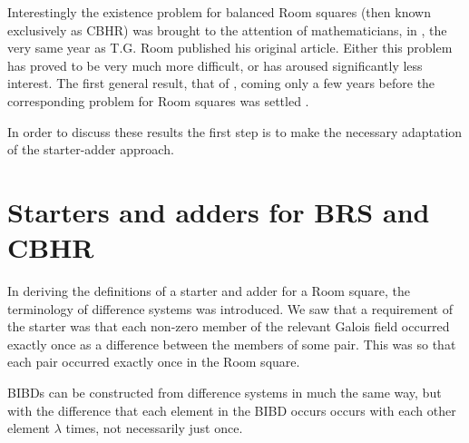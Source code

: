 \documentclass[
  11pt,
  a4paper]{book}\usepackage[]{graphicx}\usepackage[]{xcolor}
\begin{document}
Interestingly the existence problem for balanced Room
squares (then known exclusively as CBHR) was brought to the
attention of mathematicians, in
\cite{parkerBalancedHowellRotations1955},
the
very same year as T.G. Room published his original article.
Either this problem has proved to be very much more
difficult, or has aroused significantly less interest.  The
first general result, that of
\cite{hwangMoreContributionsConstructing1970},
coming only a
few years before the corresponding problem for Room squares
was settled
\cite{wallisExistenceRoomSquares1973}.

In order to discuss these results the first step is to make
the necessary adaptation of the starter-adder approach.

\section{Starters and adders for BRS and CBHR}

In deriving the definitions of a starter and adder for a
Room square, the terminology of difference systems was
introduced. We saw that a requirement of the starter was
that each non-zero member of the relevant Galois field
occurred exactly once as a difference between the members of
some pair. This was so that each pair occurred exactly once
in the Room square.

BIBDs can be constructed from difference systems in much the
same way, but with the difference that each element in the
BIBD occurs occurs with each other element $\lambda$ times,
not necessarily just once.
\end{document}
